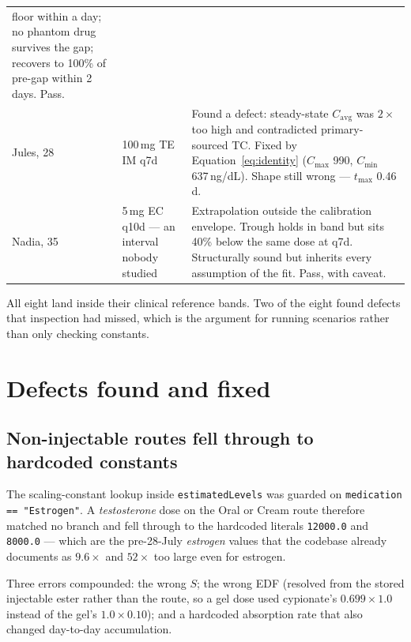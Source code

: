 \documentclass[11pt,a4paper]{article}
\newcommand{\good}[1]{\textcolor{ok}{#1}}
\newcommand{\code}[1]{\texttt{\small #1}}
\begin{document}
\begin{longtable}{@{}p{2.6cm}p{4.5cm}p{7.4cm}@{}}
   floor within a day; no phantom drug survives the gap; recovers to 100\% of
   pre-gap within 2 days. \good{Pass.} \\[0.4em]
Jules, 28 & 100\,mg TE IM q7d
 & Found a defect: steady-state $C_{\mathrm{avg}}$ was $2\times$ too high and
   contradicted primary-sourced TC. \good{Fixed} by Equation~\ref{eq:identity}
   ($C_{\max}$ 990, $C_{\min}$ 637\,ng/dL). Shape still wrong --- $t_{\max}$
   0.46\,d. \\[0.4em]
Nadia, 35 & 5\,mg EC q10d --- an interval nobody studied
 & Extrapolation outside the calibration envelope. Trough holds in band but sits
   40\% below the same dose at q7d. Structurally sound but inherits every
   assumption of the fit. \good{Pass, with caveat.} \\
\bottomrule
\end{longtable}

All eight land inside their clinical reference bands. Two of the eight found
defects that inspection had missed, which is the argument for running scenarios
rather than only checking constants.

\section{Defects found and fixed}
\label{sec:defects}

\subsection{Non-injectable routes fell through to hardcoded constants}

The scaling-constant lookup inside \code{estimatedLevels} was guarded on
\code{medication == "Estrogen"}. A \emph{testosterone} dose on the Oral or Cream
route therefore matched no branch and fell through to the hardcoded literals
\code{12000.0} and \code{8000.0} --- which are the pre-28-July \emph{estrogen}
values that the codebase already documents as $9.6\times$ and $52\times$ too
large even for estrogen.

Three errors compounded: the wrong $S$; the wrong EDF (resolved from the stored
injectable ester rather than the route, so a gel dose used cypionate's
$0.699 \times 1.0$ instead of the gel's $1.0 \times 0.10$); and a hardcoded
absorption rate that also changed day-to-day accumulation.
\end{document}
